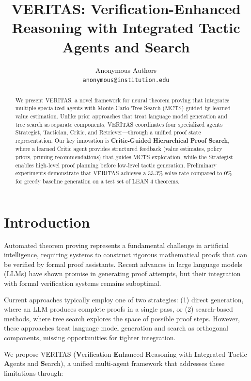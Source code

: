 \documentclass[11pt]{article}
\title{\textbf{VERITAS: Verification-Enhanced Reasoning with Integrated Tactic Agents and Search}}
\author{
    Anonymous Authors\\
    \texttt{anonymous@institution.edu}
}
\date{}
\begin{document}
\maketitle

\begin{abstract}
We present VERITAS, a novel framework for neural theorem proving that integrates multiple specialized agents with Monte Carlo Tree Search (MCTS) guided by learned value estimation. Unlike prior approaches that treat language model generation and tree search as separate components, VERITAS coordinates four specialized agents---Strategist, Tactician, Critic, and Retriever---through a unified proof state representation. Our key innovation is \textbf{Critic-Guided Hierarchical Proof Search}, where a learned Critic agent provides structured feedback (value estimates, policy priors, pruning recommendations) that guides MCTS exploration, while the Strategist enables high-level proof planning before low-level tactic generation. Preliminary experiments demonstrate that VERITAS achieves a 33.3\% solve rate compared to 0\% for greedy baseline generation on a test set of LEAN 4 theorems.
\end{abstract}

\section{Introduction}

Automated theorem proving represents a fundamental challenge in artificial intelligence, requiring systems to construct rigorous mathematical proofs that can be verified by formal proof assistants. Recent advances in large language models (LLMs) have shown promise in generating proof attempts, but their integration with formal verification systems remains suboptimal.

Current approaches typically employ one of two strategies: (1) direct generation, where an LLM produces complete proofs in a single pass, or (2) search-based methods, where tree search explores the space of possible proof steps. However, these approaches treat language model generation and search as orthogonal components, missing opportunities for tighter integration.

We propose VERITAS (\textbf{V}erification-\textbf{E}nhanced \textbf{R}easoning with \textbf{I}ntegrated \textbf{T}actic \textbf{A}gents and \textbf{S}earch), a unified multi-agent framework that addresses these limitations through:
\end{document}
